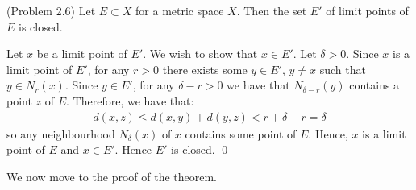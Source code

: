 \begin{nlemma}{ (Problem 2.6)}{}
    Let $E \subset X$ for a metric space $X$. Then the set $E'$ of limit points of $E$ is closed.
\end{nlemma}
\begin{nproof}
    Let $x$ be a limit point of $E'$. We wish to show that $x \in E'$. Let $\delta > 0$. Since $x$ is a limit point of $E'$, for any $r > 0$ there exists some $y \in E'$, $y \neq x$ such that $y \in N_r(x)$. Since $y \in E'$, for any $\delta - r > 0$ we have that $N_{\delta-r}(y)$ contains a point $z$ of $E$. Therefore, we have that:
    \begin{align*}
        d(x, z) \leq d(x, y) + d(y, z) < r + \delta - r = \delta
    \end{align*}
    so any neighbourhood $N_\delta(x)$ of $x$ contains some point of $E$. Hence, $x$ is a limit point of $E$ and $x \in E'$. Hence $E'$ is closed. \qed
\end{nproof}
\noindent We now move to the proof of the theorem.
